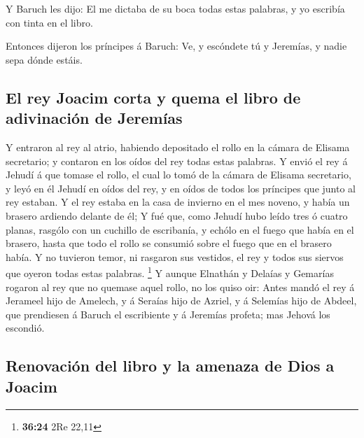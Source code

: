  Y Baruch les dijo: El me dictaba de su boca todas estas
palabras, y yo escribía con tinta en el libro.

 Entonces dijeron los príncipes á Baruch: Ve, y escóndete
tú y Jeremías, y nadie sepa dónde estáis.

\hypertarget{el-rey-joacim-corta-y-quema-el-libro-de-adivinaciuxf3n-de-jeremuxedas}{%
\subsection{El rey Joacim corta y quema el libro de adivinación de
Jeremías}\label{el-rey-joacim-corta-y-quema-el-libro-de-adivinaciuxf3n-de-jeremuxedas}}

 Y entraron al rey al atrio, habiendo depositado el rollo
en la cámara de Elisama secretario; y contaron en los oídos del rey
todas estas palabras.  Y envió el rey á Jehudí á que
tomase el rollo, el cual lo tomó de la cámara de Elisama secretario, y
leyó en él Jehudí en oídos del rey, y en oídos de todos los príncipes
que junto al rey estaban.  Y el rey estaba en la casa de
invierno en el mes noveno, y había un brasero ardiendo delante de él;
 Y fué que, como Jehudí hubo leído tres ó cuatro planas,
rasgólo con un cuchillo de escribanía, y echólo en el fuego que había en
el brasero, hasta que todo el rollo se consumió sobre el fuego que en el
brasero había.  Y no tuvieron temor, ni rasgaron sus
vestidos, el rey y todos sus siervos que oyeron todas estas palabras.
\footnote{\textbf{36:24} 2Re 22,11}  Y aunque Elnathán y
Delaías y Gemarías rogaron al rey que no quemase aquel rollo, no los
quiso oir:  Antes mandó el rey á Jerameel hijo de
Amelech, y á Seraías hijo de Azriel, y á Selemías hijo de Abdeel, que
prendiesen á Baruch el escribiente y á Jeremías profeta; mas Jehová los
escondió.

\hypertarget{renovaciuxf3n-del-libro-y-la-amenaza-de-dios-a-joacim}{%
\subsection{Renovación del libro y la amenaza de Dios a
Joacim}\label{renovaciuxf3n-del-libro-y-la-amenaza-de-dios-a-joacim}}

